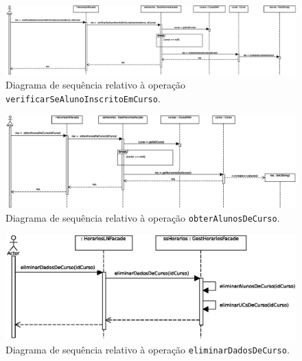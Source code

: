 \documentclass[12pt, a4paper]{article}
\begin{document}
\begin{landscape}
        \vspace*{\fill}
        \pagebreak
        \vspace*{\fill}

        \begin{figure}[H]
            \centering
            \includegraphics[scale=0.65]{Imagens/Modelos/verificarSeAlunoInscritoEmCursoDAO.svg.eps}
            \caption{
                Diagrama de sequência relativo à operação \texttt{verificarSeAlunoInscritoEmCurso}.
            }
        \end{figure}

        \vspace*{\fill}
        \pagebreak
        \vspace*{\fill}

        \begin{figure}[H]
            \centering
            \includegraphics[scale=0.75]{Imagens/Modelos/obterAlunosDeCursoDAO.svg.eps}
            \caption{
                Diagrama de sequência relativo à operação \texttt{obterAlunosDeCurso}.
            }
        \end{figure}

        \vspace*{\fill}
        \pagebreak
        \vspace*{\fill}

        \begin{figure}[H]
            \centering
            \includegraphics[scale=1.0]{Imagens/Modelos/eliminarDadosDeCursoDAO.svg.eps}
            \caption{
                Diagrama de sequência relativo à operação \texttt{eliminarDadosDeCurso}.
            }
        \end{figure}


\end{landscape}
\end{document}
